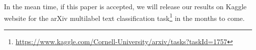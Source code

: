In the mean time, if this paper is accepted, we will release our results on Kaggle website for the arXiv multilabel text classification task\footnote{\url{https://www.kaggle.com/Cornell-University/arxiv/tasks?taskId=1757}} in the months to come.
\fi



